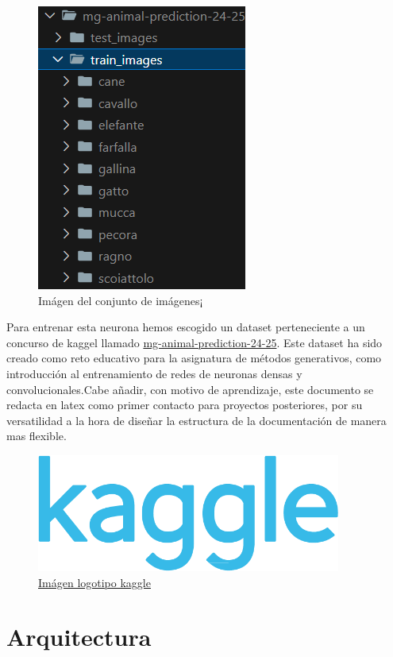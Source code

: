 \documentclass{article}
\begin{document}
    \begin{figure}[h]
        \centering
        \includegraphics{dataset_images.png}
        \caption{Imágen del conjunto de imágenes¡}
    \end{figure}

    Para entrenar esta neurona hemos escogido un dataset perteneciente a un concurso de kaggel llamado \href{https://www.kaggle.com/competitions/mg-animal-prediction-24-25}{mg-animal-prediction-24-25}. 
    Este dataset ha sido creado como reto educativo para la asignatura de métodos generativos, como introducción al entrenamiento de redes de neuronas 
    densas y convolucionales.Cabe añadir, con motivo de aprendizaje, este documento se redacta en latex como primer contacto para proyectos posteriores,
    por su versatilidad a la hora de diseñar la estructura de la documentación de manera mas flexible.
    
    \begin{figure}[h]
        \includegraphics[width=10cm]{Kaggle_logo.png}
        \centering
        \caption{\href{https://www.kaggle.com}{Imágen logotipo kaggle}}
    \end{figure}

    \newpage

    \section{Arquitectura}
\end{document}
